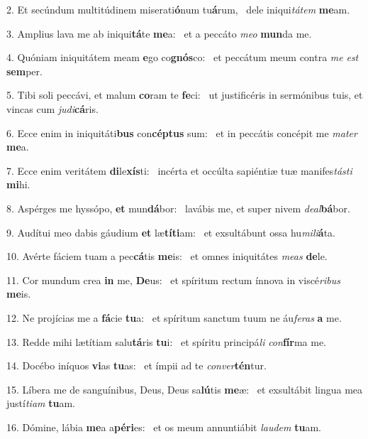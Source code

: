 2. Et secúndum multitúdinem miserati\textbf{ó}num tu\textbf{á}rum, \ast\  dele iniqui\textit{tá}\textit{tem} \textbf{me}am.\

3. Amplius lava me ab iniqui\textbf{tá}te \textbf{me}a: \ast\  et a peccáto \textit{me}\textit{o} \textbf{mun}da me.\

4. Quóniam iniquitátem meam \textbf{e}go co\textbf{gnós}co: \ast\  et peccátum meum contra \textit{me} \textit{est} \textbf{sem}per.\

5. Tibi soli peccávi, et malum \textbf{co}ram te \textbf{fe}ci: \ast\  ut justificéris in sermónibus tuis, et vincas cum \textit{ju}\textit{di}\textbf{cá}ris.\

6. Ecce enim in iniquitáti\textbf{bus} con\textbf{cép}\textbf{tus} sum: \ast\  et in peccátis concépit me \textit{ma}\textit{ter} \textbf{me}a.\

7. Ecce enim veritátem \textbf{di}le\textbf{xís}ti: \ast\  incérta et occúlta sapiéntiæ tuæ manifes\textit{tás}\textit{ti} \textbf{mi}hi.\

8. Aspérges me hyssópo, \textbf{et} mun\textbf{dá}bor: \ast\  lavábis me, et super nivem \textit{de}\textit{al}\textbf{bá}bor.\

9. Audítui meo dabis gáudium \textbf{et} læ\textbf{tí}\textbf{ti}am: \ast\  et exsultábunt ossa hu\textit{mi}\textit{li}\textbf{á}ta.\

10. Avérte fáciem tuam a pec\textbf{cá}tis \textbf{me}is: \ast\  et omnes iniquitátes \textit{me}\textit{as} \textbf{de}le.\

11. Cor mundum crea \textbf{in} me, \textbf{De}us: \ast\  et spíritum rectum ínnova in viscé\textit{ri}\textit{bus} \textbf{me}is.\

12. Ne projícias me a \textbf{fá}cie \textbf{tu}a: \ast\  et spíritum sanctum tuum ne áu\textit{fe}\textit{ras} \textbf{a} me.\

13. Redde mihi lætítiam salu\textbf{tá}ris \textbf{tu}i: \ast\  et spíritu principá\textit{li} \textit{con}\textbf{fír}ma me.\

14. Docébo iníquos \textbf{vi}as \textbf{tu}as: \ast\  et ímpii ad te \textit{con}\textit{ver}\textbf{tén}tur.\

15. Líbera me de sanguínibus, Deus, Deus sa\textbf{lú}tis \textbf{me}æ: \ast\  et exsultábit lingua mea justí\textit{ti}\textit{am} \textbf{tu}am.\

16. Dómine, lábia \textbf{me}a a\textbf{pé}\textbf{ri}es: \ast\  et os meum annuntiábit \textit{lau}\textit{dem} \textbf{tu}am.\

